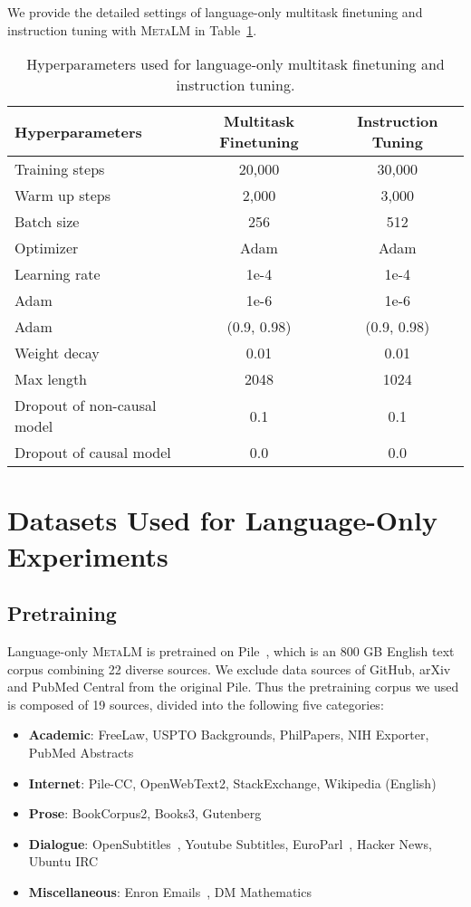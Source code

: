 \documentclass{article}
\theoremstyle{plain}
\theoremstyle{definition}
\theoremstyle{remark}
\newcommand\ours{\textsc{MetaLM}}
\begin{document}
We provide the detailed settings of language-only multitask finetuning and instruction tuning with \ours{} in Table~\ref{tbl:hyperparam:lang:multi}.


\begin{table}[ht]
\centering
\small
\renewcommand\tabcolsep{3.5pt}
\begin{tabular}{lcc}
\toprule
\textbf{Hyperparameters} & \textbf{Multitask Finetuning} & \textbf{Instruction Tuning} \\ \midrule
Training steps & 20,000 & 30,000 \\
Warm up steps & 2,000 & 3,000 \\
Batch size & 256 & 512\\
Optimizer & Adam & Adam \\
Learning rate & 1e-4 & 1e-4 \\
Adam  & 1e-6 & 1e-6 \\
Adam  & (0.9, 0.98) & (0.9, 0.98) \\
Weight decay & 0.01 & 0.01 \\
Max length & 2048 & 1024 \\
Dropout of non-causal model & 0.1 & 0.1 \\
Dropout of causal model & 0.0 & 0.0 \\
\bottomrule
\end{tabular}
\caption{Hyperparameters used for language-only multitask finetuning and instruction tuning. 
}
\label{tbl:hyperparam:lang:multi}
\end{table}


\section{Datasets Used for Language-Only Experiments}
\label{app:corpora:pt:lang}

\subsection{Pretraining}
\label{app:corpora:data:lang:pt}

Language-only \ours{} is pretrained on Pile~\citep{pile}, which is an 800 GB English text corpus combining 22 diverse sources.
We exclude data sources of GitHub, arXiv and PubMed Central from the original Pile.
Thus the pretraining corpus we used is composed of 19 sources, divided into the following five categories:
\begin{itemize}[leftmargin=*]
\item \textbf{Academic}: FreeLaw, USPTO Backgrounds, PhilPapers, NIH Exporter, PubMed Abstracts
\item \textbf{Internet}: Pile-CC, OpenWebText2, StackExchange, Wikipedia (English)
\item \textbf{Prose}: BookCorpus2, Books3, Gutenberg~\citep[PG-19]{pg19}
\item \textbf{Dialogue}: OpenSubtitles~\citep{opensubtitle}, Youtube Subtitles, EuroParl~\citep{europarl}, Hacker News, Ubuntu IRC
\item \textbf{Miscellaneous}: Enron Emails~\citep{enron}, DM Mathematics~\citep{dmmath}
\end{itemize}
\end{document}
